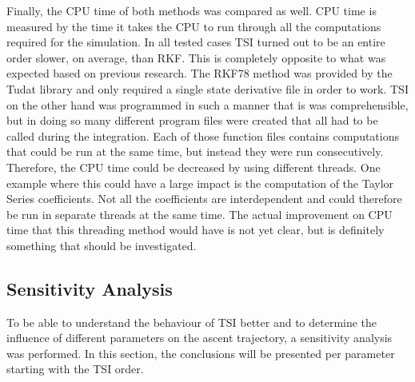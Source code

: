 Finally, the CPU time of both methods was compared as well. CPU time is measured by the time it takes the CPU to run through all the computations required for the simulation. In all tested cases \ac{TSI} turned out to be an entire order slower, on average, than \ac{RKF}. This is completely opposite to what was expected based on previous research. The \ac{RKF78} method was provided by the \ac{Tudat} library and only required a single state derivative file in order to work. \ac{TSI} on the other hand was programmed in such a manner that is was comprehensible, but in doing so many different program files were created that all had to be called during the integration. Each of those function files contains computations that could be run at the same time, but instead they were run consecutively. Therefore, the CPU time could be decreased by using different threads. One example where this could have a large impact is the computation of the Taylor Series coefficients. Not all the coefficients are interdependent and could therefore be run in separate threads at the same time. The actual improvement on CPU time that this threading method would have is not yet clear, but is definitely something that should be investigated.






\subsection{Sensitivity Analysis}
\label{subsec:sensitivityAnalysis}
To be able to understand the behaviour of \ac{TSI} better and to determine the influence of different parameters on the ascent trajectory, a sensitivity analysis was performed. In this section, the conclusions will be presented per parameter starting with the \ac{TSI} order.

